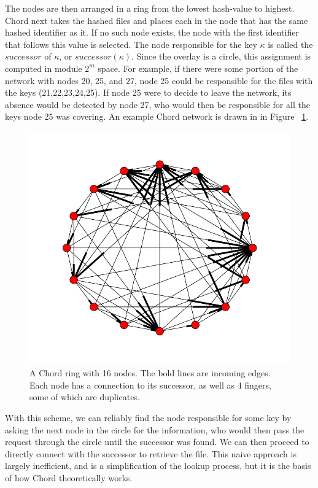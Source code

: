 \documentclass[conference, compsocconf, letterpaper]{IEEEtran}
\begin{document}
The nodes are then arranged in a ring from the lowest hash-value to highest.  Chord next takes the hashed files and places each in the node that has the same hashed identifier as it.  If no such node exists, the node with the first identifier that follows this value is selected.  The node responsible for the key $\kappa$ is called the $successor$ of $\kappa$, or $successor(\kappa)$.  Since the overlay is a circle, this assignment is computed in module $2^m$ space.  For example, if there were some portion of the network with nodes 20, 25, and 27, node 25 could be responsible for the files with the keys (21,22,23,24,25). If node 25 were to decide to leave the network, its absence would be detected by node 27, who would then be responsible for all the keys node 25 was covering. An example Chord network is drawn in in Figure ~\ref{chordreal}.
\begin{figure}
    \includegraphics[width=\linewidth]{chordreal}
    \caption{A Chord ring with 16 nodes.  The bold lines are incoming edges.  Each node has a connection to its successor, as well as 4 fingers, some of which are duplicates.}
    \label{chordreal}
\end{figure}


With this scheme, we can reliably find the node responsible for some key by asking the next node in the circle for the information, who would then pass the request through the circle until the successor was found.  We can then proceed to directly connect with the successor to retrieve the file.  This naive approach is largely inefficient, and is a simplification of the lookup process, but it is the basis of how Chord theoretically works.
\end{document}
